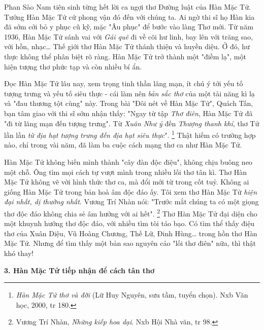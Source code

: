\documentclass[../main.tex]{subfiles}
\begin{document}
\begin{multicols}{2}
Phan Sào Nam tiên sinh từng hết lời ca ngợi thơ Đường luật của Hàn Mặc Tử. Tưởng Hàn Mặc Tử cứ phong vận đó đến với chúng ta. Ai ngờ thi sĩ họ Hàn kia đã sớm cởi bỏ y phục cũ kỹ, mặc "Âu phục" để bước vào làng Thơ mới. Từ năm 1936, Hàn Mặc Tử sánh vai với \textit{Gái quê} đi về cõi hư linh, bay lên với trăng sao, với hồn, nhạc… Thế giới thơ Hàn Mặc Tử thánh thiện và huyền diệu. Ở đó, hư thực không thể phân biệt rõ ràng. Hàn Mặc Tử trở thành một "điềm lạ", một hiện tượng thơ phức tạp và còn nhiều bí ẩn.  
 
Đọc Hàn Mặc Tử lâu nay, xem trọng tinh thần lãng mạn, ít chú ý tới yếu tố tượng trưng và yếu tố siêu thực - cái làm nên \textit{bản sắc thơ} của một tài năng kì lạ và "đau thương tột cùng" này. Trong bài "Đôi nét về Hàn Mặc Tử", Quách Tấn, bạn tâm giao với thi sĩ sớm nhận thấy: "Ngay từ tập \textit{Thơ điên}, Hàn Mặc Tử đã "đi từ lãng mạn đến tượng trưng". Từ \textit{Xuân Như ý} đến \textit{Thượng thanh khí}, thơ Tử lần lần \textit{từ địa hạt tượng trưng đến địa hạt siêu thực}". \footnote{
\textit{Hàn Mặc Tử thơ và đời} (Lữ Huy Nguyên, sưu tầm, tuyển chọn). Nxb Văn học, 2000, tr 180.}  Thật hiếm có trường hợp nào, chỉ trong vài năm, đã làm ba cuộc cách mạng thơ ca như Hàn Mặc Tử.  
 
Hàn Mặc Tử không biến mình thành "cây đàn độc điệu", không chịu buông neo một chỗ. Ông tìm mọi cách tự vượt mình trong nhiều lối thơ tân kì. Thơ Hàn Mặc Tử không vẽ vời hình thức thơ ca, mà đổi mới từ trong cốt tuỷ. Không ai giống Hàn Mặc Tử trong bản hoà âm độc đáo ấy. Tôi xem thơ Hàn Mặc Tử \textit{hiện đại nhất, dị thường nhất}. Vương Trí Nhàn nói: "Trước mắt chúng ta có một giọng thơ độc đáo không chia sẻ âm hưởng với ai hết". \footnote{
Vương Trí Nhàn, \textit{Những kiếp hoa dại}. Nxb Hội Nhà văn, tr 98.}  Thơ Hàn Mặc Tử đại diện cho một khuynh hướng thơ độc đáo, với nhiều tìm tòi táo bạo. Có tìm thể thấy điệu thơ của Xuân Diệu, Vũ Hoàng Chương, Thế Lữ, Đinh Hùng… trong hồn thơ Hàn Mặc Tử. Nhưng để tìm thấy một bản sao nguyên cảo "lối thơ điên" nữa, thì  thật khó thay! 
       
 
\textbf{3. Hàn Mặc Tử tiếp nhận để cách tân thơ} 
 

\end{multicols}
\end{document}
